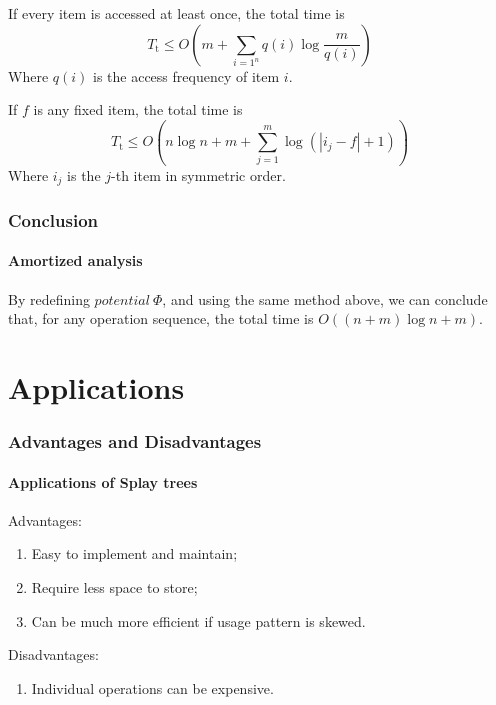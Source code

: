 \documentclass{beamer}
\theoremstyle{plain}
\begin{document}
    \begin{frame}
    
        \begin{theorem}
            If every item is accessed at least once, the total time is \[T_\mathrm{t} \leq O(m + \sum_{i=1^n}q(i)\log \frac{m}{q(i)})\]
            Where $q(i)$ is the access frequency of item $i$.
        \end{theorem}

        \begin{theorem}
            If $f$ is any fixed item, the total time is \[T_\mathrm{t} \leq O(n \log n + m + \sum_{j=1}^m \log (|i_j - f| + 1))\]
            Where $i_j$ is the $j$-th item in symmetric order.
        \end{theorem}

    
    \end{frame}

    \begin{frame}
        \frametitle{Conclusion}
        \framesubtitle{Amortized analysis}
    
        By redefining $potential\ \varPhi$, and using the same method above, we can conclude that, for any operation sequence, the total time
        is $O((n + m) \log n + m)$.
    
    \end{frame}

    \section{Applications}
    \begin{frame}
        \frametitle{Advantages and Disadvantages}
        \framesubtitle{Applications of Splay trees}
    
        Advantages: \pause
        \begin{enumerate}
            \item Easy to implement and maintain; \pause
            \item Require less space to store; \pause
            \item Can be much more efficient if usage pattern is skewed. \pause
        \end{enumerate}

        Disadvantages: \pause
        \begin{enumerate}
            \item Individual operations can be expensive.
        \end{enumerate}
    
    \end{frame}
\end{document}
